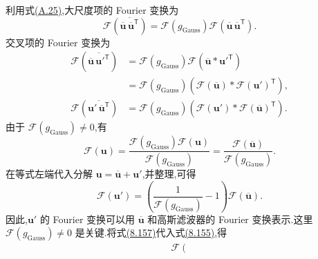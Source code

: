 \begin{note}[步骤 1 和 2]
\label{note:les-wave-number-steps-one-two}
利用式\hyperref[eq:appendix-a-25]{(A.25)},大尺度项的 Fourier 变换为
\begin{equation}\label{eq:les-wave-large-scale-fourier}
 \mathcal{F}\!\left(
  \overline{\overline{\bm{u}}\,
  \overline{\bm{u}}^{\mathsf T}}\right)
 =\mathcal{F}(g_{\mathrm{Gauss}})
  \mathcal{F}\!\left(
   \overline{\bm{u}}\,
   \overline{\bm{u}}^{\mathsf T}\right).
\end{equation}
交叉项的 Fourier 变换为
\begin{equation}\label{eq:les-wave-cross-terms-fourier}
\begin{aligned}
 \mathcal{F}\!\left(
  \overline{\overline{\bm{u}}\,\bm{u}'^{\mathsf T}}\right)
 &=\mathcal{F}(g_{\mathrm{Gauss}})
   \mathcal{F}\!\left(
    \overline{\bm{u}}*\bm{u}'^{\mathsf T}\right)\\
 &=\mathcal{F}(g_{\mathrm{Gauss}})
   \left(
    \mathcal{F}(\overline{\bm{u}})
    *\mathcal{F}(\bm{u}')^{\mathsf T}\right),\\
 \mathcal{F}\!\left(
  \overline{\bm{u}'\,\overline{\bm{u}}^{\mathsf T}}\right)
 &=\mathcal{F}(g_{\mathrm{Gauss}})
   \left(
    \mathcal{F}(\bm{u}')
    *\mathcal{F}(\overline{\bm{u}})^{\mathsf T}\right).
\end{aligned}
\end{equation}
由于 $\mathcal{F}(g_{\mathrm{Gauss}})\ne0$,有
\begin{equation}\label{eq:les-wave-filtered-velocity-transform}
 \mathcal{F}(\bm{u})
 =\frac{\mathcal{F}(g_{\mathrm{Gauss}})
        \mathcal{F}(\bm{u})}
       {\mathcal{F}(g_{\mathrm{Gauss}})}
 =\frac{\mathcal{F}(\overline{\bm{u}})}
        {\mathcal{F}(g_{\mathrm{Gauss}})}.
\end{equation}
在等式左端代入分解 $\bm{u}=\overline{\bm{u}}+\bm{u}'$,并整理,可得
\begin{equation}\label{eq:les-wave-fluctuation-transform}
 \mathcal{F}(\bm{u}')
 =\left(
   \frac{1}{\mathcal{F}(g_{\mathrm{Gauss}})}-1
  \right)\mathcal{F}(\overline{\bm{u}}).
\end{equation}
因此,$\bm{u}'$ 的 Fourier 变换可以用 $\overline{\bm{u}}$ 和高斯滤波器的 Fourier 变换表示.这里 $\mathcal{F}(g_{\mathrm{Gauss}})\ne0$ 是关键.将式\hyperref[eq:les-wave-fluctuation-transform]{(8.157)}代入式\hyperref[eq:les-wave-cross-terms-fourier]{(8.155)},得
\begin{equation}\label{eq:les-wave-cross-terms-filtered}
\begin{aligned}
 \mathcal{F}\!\left(

\end{aligned}
\end{equation}
\end{note}
